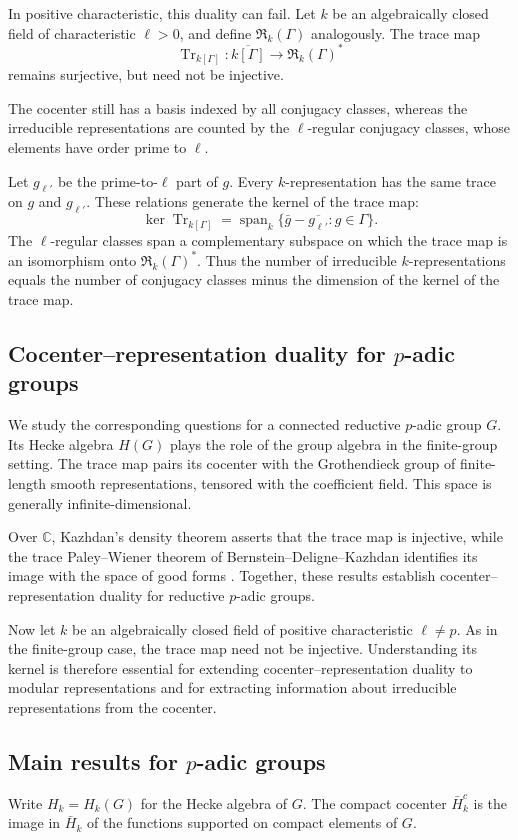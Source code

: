 \documentclass[11pt,letterpaper]{amsart}
\theoremstyle{definition}
\numberwithin{equation}{section}
\numberwithin{theorem}{section}
\newcommand{\kk}{k}
\newcommand{\CC}{\mathbb C}
\newcommand{\cR}{\mathfrak R}
\DeclareMathOperator{\Tr}{Tr}
\DeclareMathOperator{\spanop}{span}
\begin{document}
In positive characteristic, this duality can fail.
Let $\kk$ be an algebraically closed field of characteristic
$\ell>0$, and define $\cR_\kk(\Gamma)$ analogously.
The trace map
\[
 \Tr_{\kk[\Gamma]}:
 \overline{\kk[\Gamma]}
 \longrightarrow\cR_\kk(\Gamma)^*
\]
remains surjective, but need not be injective.

The cocenter still has a basis indexed by all conjugacy
classes, whereas the irreducible representations are counted
by the $\ell$-regular conjugacy classes, whose elements have order prime to $\ell$.

Let $g_{\ell'}$ be the prime-to-$\ell$ part of $g$.
Every $\kk$-representation has the same trace on $g$ and
$g_{\ell'}$. These relations generate the kernel of the trace map: 
\[
 \ker\Tr_{\kk[\Gamma]}
   =\spanop_\kk
      \{\bar g-\overline{g_{\ell'}}:g\in\Gamma\}.
\]
The $\ell$-regular classes span a complementary subspace
on which the trace map is an isomorphism onto $\cR_\kk(\Gamma)^*$. Thus the number of irreducible $\kk$-representations equals the number of conjugacy classes minus the dimension of the kernel of the trace map. 

\subsection{Cocenter--representation duality for $p$-adic groups}
We study the corresponding questions for a connected reductive $p$-adic group $G$. Its Hecke algebra $H(G)$ plays the role of the group algebra in the finite-group setting. The trace map pairs its cocenter with the Grothendieck group of finite-length smooth representations, tensored with the coefficient field. This space is generally infinite-dimensional.

Over $\CC$, Kazhdan's density theorem asserts that the trace
map is injective, while the trace Paley--Wiener theorem of
Bernstein--Deligne--Kazhdan identifies its image with the
space of good forms \cite{Kaz86,KazClose,BDK}.
Together, these results establish cocenter--representation
duality for reductive $p$-adic groups.

Now let $\kk$ be an algebraically closed field of positive
characteristic $\ell\ne p$. As in the finite-group case,
the trace map need not be injective. Understanding its kernel is therefore essential for extending cocenter--representation duality
to modular representations and for extracting information
about irreducible representations from the cocenter.

\subsection{Main results for $p$-adic groups}
Write $H_\kk=H_\kk(G)$ for the Hecke algebra of $G$.
The compact cocenter $\bar H_\kk^c$ is the image in
$\bar H_\kk$ of the functions supported on compact
elements of $G$.
\end{document}
